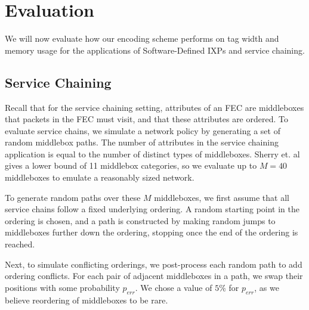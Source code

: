 \section{Evaluation} \label{sec:evaluation}
We will now evaluate how our encoding scheme performs on tag width and memory usage for the applications of Software-Defined IXPs and service chaining.

\subsection{Service Chaining}
Recall that for the service chaining setting, attributes of an FEC are middleboxes that packets in the FEC must visit, and that these attributes are ordered.
To evaluate service chains, we simulate a network policy by generating a set of random middlebox paths. The number of attributes in the service chaining application is equal to the number of distinct types of middleboxes. Sherry et. al~\cite{Sherry:2012} gives a lower bound of 11 middlebox categories, so we evaluate up to $M = 40$ middleboxes to emulate a reasonably sized network. 

To generate random paths over these $M$ middleboxes, we first assume that all service chains follow a fixed underlying ordering. A random starting point in the ordering is chosen, and a path is constructed by making random jumps to middleboxes further down the ordering, stopping once the end of the ordering is reached.

Next, to simulate conflicting orderings, we post-process each random path to add ordering conflicts. For each pair of adjacent middleboxes in a path, we swap their positions with some probability $p_{err}$. We chose a value of $5\%$ for $p_{err}$, as we believe reordering of middleboxes to be rare. 

